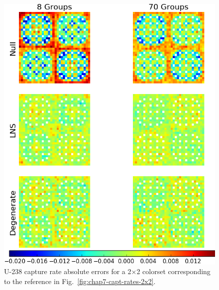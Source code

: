 \begin{appendices}
\begin{figure}[h!]
\centering
\includegraphics[width=\linewidth]{figures/patterns/appendix/2x2/capt-err}
\vspace{2mm}
\caption[U-238 capture rate absolute errors for a 2$\times$2 periodic colorset]{U-238 capture rate absolute errors for a 2$\times$2 colorset corresponding to the reference in Fig.~\ref{fig:chap7-capt-rates-2x2}.}
\label{fig:lns-2x2-capt-err-abs}
\end{figure}

\clearpage


\end{appendices}
